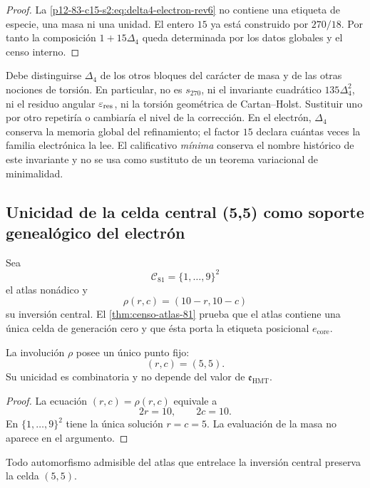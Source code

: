 \begin{proof}
La \cref{p12-83-c15-s2:eq:delta4-electron-rev6} no contiene una etiqueta de especie, una
masa ni una unidad. El entero \(15\) ya está construido por \(270/18\).
Por tanto la composición \(1+15\Delta_4\) queda determinada por los datos
globales y el censo interno.
\end{proof}

Debe distinguirse \(\Delta_4\) de los otros bloques del carácter de masa y de
las otras nociones de torsión. En particular, no es \(s_{270}\), ni el
invariante cuadrático \(135\Delta_4^2\), ni el residuo angular
\(\varepsilon_{\rm res}\), ni la torsión geométrica de Cartan--Holst.
Sustituir uno por otro repetiría o cambiaría el nivel de la corrección. En el
electrón, \(\Delta_4\) conserva la memoria global del refinamiento; el factor
\(15\) declara cuántas veces la familia electrónica la lee. El calificativo
\emph{mínima} conserva el nombre histórico de este invariante y no se usa
como sustituto de un teorema variacional de minimalidad.

\subsection{Unicidad de la celda central (5,5) como soporte genealógico del electrón}

Sea
\[
 \mathcal C_{81}=\{1,\ldots,9\}^2
\]
el atlas nonádico y
\[
 \rho(r,c)=(10-r,10-c)
\]
su inversión central. El \cref{thm:censo-atlas-81} prueba que el atlas
contiene una única celda de generación cero y que ésta porta la etiqueta
posicional \(e_{\mathrm{core}}\).

\begin{proposition}
\label{p12-83-c15-s2:prop:centro-electron-rev6}
La involución \(\rho\) posee un único punto fijo:
\[
 \boxed{(r,c)=(5,5).}
\]
Su unicidad es combinatoria y no depende del valor de
\(\mathfrak e_{\mathrm{HMT}}\).
\end{proposition}

\begin{proof}
La ecuación \((r,c)=\rho(r,c)\) equivale a
\[
 2r=10,\qquad2c=10.
\]
En \(\{1,\ldots,9\}^2\) tiene la única solución \(r=c=5\). La evaluación
de la masa no aparece en el argumento.
\end{proof}

\begin{corollary}
\label{p12-83-c15-s2:cor:universalidad-electron-central-rev6}
Todo automorfismo admisible del atlas que entrelace la inversión central
preserva la celda \((5,5)\).
\end{corollary}

